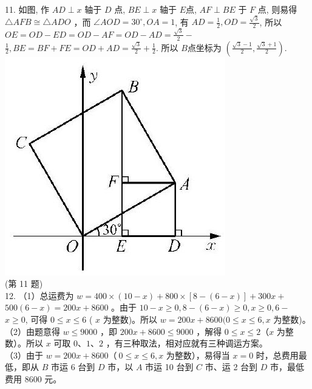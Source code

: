 \documentclass[10pt]{article}
\begin{document}
11. 如图, 作 $A D \perp x$ 轴于 $D$ 点, $B E \perp x$ 轴于 $E$点, $A F \perp B E$ 于 $F$ 点, 则易得 $\triangle A F B \cong \triangle A D O$ ，而 $\angle A O D=30^{\circ}, O A=1$, 有 $A D=\frac{1}{2}, O D=\frac{\sqrt{3}}{2}$, 所以 $O E=O D-E D=O D-A F=O D-A D=\frac{\sqrt{3}}{2}-$ $\frac{1}{2}, B E=B F+F E=O D+A D=\frac{\sqrt{3}}{2}+\frac{1}{2}$. 所以 $B$点坐标为 $\left(\frac{\sqrt{3}-1}{2}, \frac{\sqrt{3}+1}{2}\right)$.\\
\includegraphics[max width=\textwidth, center]{2024_10_30_1bf34f7aeb61f11d11d3g-109}\\
(第 11 题)\\
12. （1）总运费为 $w=400 \times(10-x)+800 \times[8-(6-x)]+300 x+$ $500(6-x)=200 x+8600$ 。由于 $10-x \geqslant 0,8-(6-x) \geqslant 0, x \geqslant 0,6-$ $x \geqslant 0$, 可得 $0 \leqslant x \leqslant 6$ ( $x$ 为整数)。所以 $w=200 x+8600(0 \leqslant x \leqslant 6, x$ 为整数)。\\
（2）由题意得 $w \leqslant 9000$ ，即 $200 x+8600 \leqslant 9000$ ，解得 $0 \leqslant x \leqslant 2（x$ 为整数）。所以 $x$ 可取 $0 、 1 、 2$ ，有三种取法，相对应就有三种调运方案。\\
（3）由于 $w=200 x+8600（~ 0 \leqslant x \leqslant 6, x$ 为整数），易得当 $x=0$ 时，总费用最低，即从 $B$ 市运 6 台到 $D$ 市，以 $A$ 市运 10 台到 $C$ 市、运 2 台到 $D$ 市，最低费用 8600 元。\\
\end{document}
